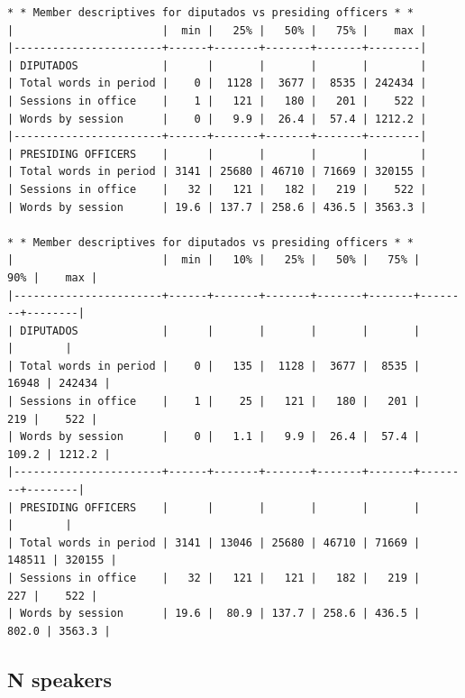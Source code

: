 \documentclass[letter,12pt]{article}
\begin{document}
\singlespacing
\begin{footnotesize}
\begin{verbatim}
* * Member descriptives for diputados vs presiding officers * *
|                       |  min |   25% |   50% |   75% |    max |
|-----------------------+------+-------+-------+-------+--------|
| DIPUTADOS             |      |       |       |       |        |
| Total words in period |    0 |  1128 |  3677 |  8535 | 242434 |
| Sessions in office    |    1 |   121 |   180 |   201 |    522 |
| Words by session      |    0 |   9.9 |  26.4 |  57.4 | 1212.2 |
|-----------------------+------+-------+-------+-------+--------|
| PRESIDING OFFICERS    |      |       |       |       |        |
| Total words in period | 3141 | 25680 | 46710 | 71669 | 320155 |
| Sessions in office    |   32 |   121 |   182 |   219 |    522 |
| Words by session      | 19.6 | 137.7 | 258.6 | 436.5 | 3563.3 |

* * Member descriptives for diputados vs presiding officers * *
|                       |  min |   10% |   25% |   50% |   75% |    90% |    max |
|-----------------------+------+-------+-------+-------+-------+--------+--------|
| DIPUTADOS             |      |       |       |       |       |        |        |
| Total words in period |    0 |   135 |  1128 |  3677 |  8535 |  16948 | 242434 |
| Sessions in office    |    1 |    25 |   121 |   180 |   201 |    219 |    522 |
| Words by session      |    0 |   1.1 |   9.9 |  26.4 |  57.4 |  109.2 | 1212.2 |
|-----------------------+------+-------+-------+-------+-------+--------+--------|
| PRESIDING OFFICERS    |      |       |       |       |       |        |        |
| Total words in period | 3141 | 13046 | 25680 | 46710 | 71669 | 148511 | 320155 |
| Sessions in office    |   32 |   121 |   121 |   182 |   219 |    227 |    522 |
| Words by session      | 19.6 |  80.9 | 137.7 | 258.6 | 436.5 |  802.0 | 3563.3 |

\end{verbatim}
\end{footnotesize}
\doublespacing




\subsection{N speakers}
\end{document}
